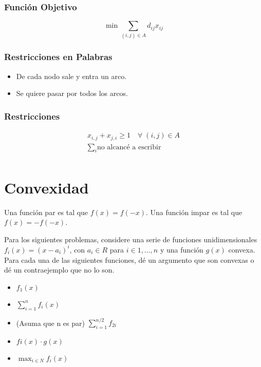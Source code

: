 \documentclass{article}
\begin{document}
\subsubsection*{Función Objetivo}
\begin{equation}
    \min \sum_{(i,j)\in A} d_{ij}x_{ij}
\end{equation}
\subsubsection*{Restricciones en Palabras}
\begin{itemize}
    \item De cada nodo sale y entra un arco.
    \item Se quiere pasar por todos los arcos.
\end{itemize}
\subsubsection*{Restricciones}
\begin{align}
    x_{i,j}+x_{j,i} \geq 1 \quad \forall\;(i,j)\in A \\
    \sum_{i} \text{no alcancé a escribir}\\
\end{align}
\section{Convexidad}
Una función par es tal que \(f(x) = f(-x)\). Una función impar es tal que \(f(x) = -f(-x)\).

Para los siguientes problemas, considere una serie de funciones unidimensionales \(f_i(x) = (x-a_i)^i\), 
con \(a_i\in R\) para \(i\in 1,\dots,n\) y una función \(g(x)\) convexa. 
Para cada una de las siguientes funciones, dé un argumento que son convexas o dé un contraejemplo que no lo son.

\begin{itemize}
    \item \(f_1(x)\)
    \item \(\sum_{i=1}^{n} f_i(x)\)
    \item (Asuma que n es par) \(\sum_{i=1}^{n/2} f_{2i}\)
    \item \(fi(x)\cdot g(x)\)
    \item \(\max_{i\in N} f_i(x)\)
\end{itemize}
\end{document}
